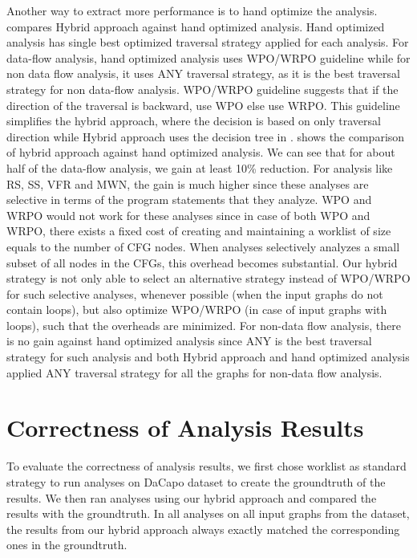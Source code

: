 Another way to extract more performance is to hand optimize the analysis.
 compares Hybrid approach against hand optimized analysis. Hand optimized analysis has single best optimized traversal strategy applied for each analysis. For data-flow analysis, hand optimized analysis uses WPO/WRPO guideline while for non data flow analysis, it uses ANY traversal strategy, as it is the best traversal strategy for non data-flow analysis. WPO/WRPO guideline suggests that if the direction of the traversal is backward, use WPO else use WRPO. This guideline  
simplifies the hybrid approach, where the decision is based on only traversal 
direction while Hybrid approach uses the decision tree in . 
 shows the 
comparison of hybrid approach against hand optimized analysis. We can see that for 
about half of the data-flow analysis, we gain at least 10\% reduction. For analysis like 
RS, SS, VFR and MWN, the gain is much higher since these analyses are 
selective in terms of the program statements that they analyze. WPO and WRPO 
would not work for these analyses since in case of both WPO and WRPO, there 
exists a fixed cost of creating and maintaining a worklist of size equals to 
the number of CFG nodes. When analyses selectively analyzes a small subset of 
all nodes in the CFGs, this overhead becomes substantial. Our hybrid strategy 
is not only able to select an alternative strategy instead of WPO/WRPO for 
such selective analyses, whenever possible (when the input graphs do not 
contain loops), but also optimize WPO/WRPO (in case of input graphs with loops), 
such that the overheads are minimized.
For non-data flow analysis, there is no gain against hand optimized analysis since ANY is the best traversal strategy for such analysis and both Hybrid approach and hand optimized analysis applied ANY traversal strategy for all the graphs for non-data flow analysis.
\chapter{Correctness of Analysis Results}
\label{sec:soundness}

To evaluate the correctness of analysis results, we first chose worklist 
as standard strategy to run analyses on DaCapo dataset to create the 
groundtruth of the results. We then ran analyses using our hybrid approach 
and compared the results with the groundtruth. In all analyses on all 
input graphs from the dataset, the results from our hybrid approach always 
exactly matched the corresponding ones in the groundtruth. 

